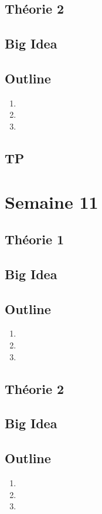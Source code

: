 \documentclass{article}
\begin{document}
\subsection{Théorie 2}
\subsection*{Big Idea}
\subsection*{Outline}
    \begin{enumerate}
    \item
    \item
    \item
    \end{enumerate}
\subsection{TP}

\pagebreak
\section{Semaine 11}
\subsection{Théorie 1}
\subsection*{Big Idea}
\subsection*{Outline}
    \begin{enumerate}
    \item
    \item
    \item
    \end{enumerate}
\subsection{Théorie 2}
\subsection*{Big Idea}
\subsection*{Outline}
    \begin{enumerate}
    \item
    \item
    \item
    \end{enumerate}
\end{document}
